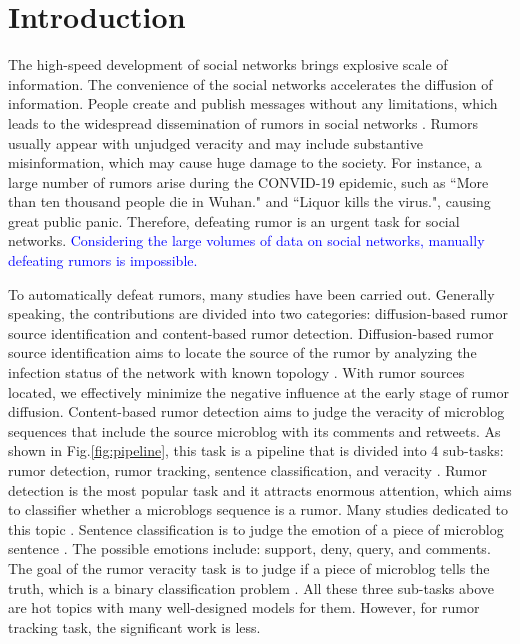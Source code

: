 \section{Introduction}
\label{sec:introduction}
The high-speed development of social networks brings explosive scale of information. The convenience of the social networks accelerates the diffusion of information. People create and publish messages without any limitations, which leads to the widespread dissemination of rumors in social networks \cite{DBLP:journals/corr/KurkaGZ15, DBLP:journals/csur/ZubiagaABLP18, DBLP:conf/sirocco/KostkaOW08, vosoughi2018spread}. Rumors usually appear with unjudged veracity and may include substantive misinformation, which may cause huge damage to the society. For instance, a large number of rumors arise during the CONVID-19 epidemic, such as ``More than ten thousand people die in Wuhan." and ``Liquor kills the virus.", causing great public panic. Therefore, defeating rumor is an urgent task for social networks. \textcolor{blue}{Considering the large volumes of data on social networks, manually defeating rumors is impossible. }

To automatically defeat rumors, many studies have been carried out. Generally speaking, the contributions are divided into two categories:  diffusion-based rumor source identification and content-based rumor detection. Diffusion-based rumor source identification aims to locate the source of the rumor by analyzing the infection status of the network with known topology \cite{DBLP:conf/sigmetrics/ShahZ10, DBLP:journals/tit/ShahZ11, DBLP:conf/kdd/LappasTGM10}. With rumor sources located, we effectively minimize the negative influence at the early stage of rumor diffusion. Content-based rumor detection aims to judge the veracity of microblog sequences that include the source microblog with its comments and retweets. As shown in Fig.\ref{fig:pipeline}, this task is a pipeline that is divided into 4 sub-tasks: rumor detection, rumor tracking, sentence classification, and veracity \cite{DBLP:journals/csur/ZubiagaABLP18, DBLP:conf/coling/KochkinaLZ18}. Rumor detection is the most popular task and it attracts enormous attention, which aims to classifier whether a microblogs sequence is a rumor. Many studies dedicated to this topic \cite{DBLP:conf/socinfo/ZubiagaLP17, DBLP:conf/www/Ma0W19,DBLP:conf/naacl/NguyenDCD19, DBLP:journals/corr/abs-1906-05659}. Sentence classification is to judge the emotion of a piece of microblog sentence \cite{DBLP:conf/semeval/EnayetE17, DBLP:conf/semeval/X17a, DBLP:conf/coling/ZubiagaKLPL16}. The possible emotions include: support, deny, query, and comments. The goal of the rumor veracity task is to judge if a piece of microblog tells the truth, which is a binary classification problem \cite{DBLP:conf/coling/KochkinaLZ18, DBLP:conf/acl/LiZS19, DBLP:conf/acl/KumarC19}. All these three sub-tasks above are hot topics with many well-designed models for them. However, for rumor tracking task, the significant work is less.

